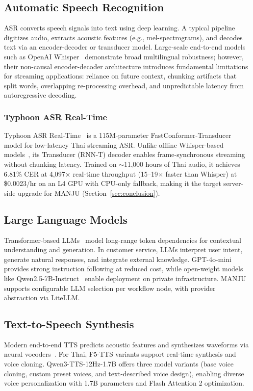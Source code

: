 \documentclass[10pt, a4paper, twocolumn]{article}
\begin{document}
\subsection{Automatic Speech Recognition}
ASR converts speech signals into text using deep learning.
A typical pipeline digitizes audio, extracts acoustic features (e.g., mel-spectrograms), and decodes text via an encoder-decoder or transducer model.
Large-scale end-to-end models such as OpenAI Whisper~\cite{radford2022whisper} demonstrate broad multilingual robustness; however, their non-causal encoder-decoder architecture introduces fundamental limitations for streaming applications: reliance on future context, chunking artifacts that split words, overlapping re-processing overhead, and unpredictable latency from autoregressive decoding.

\subsubsection{Typhoon ASR Real-Time}
Typhoon ASR Real-Time~\cite{sirichotedumrong2026typhoonasr} is a 115M-parameter FastConformer-Transducer model for low-latency Thai streaming ASR.
Unlike offline Whisper-based models~\cite{tipaksorn2024pathumma,aung2024thonburian}, its Transducer (RNN-T) decoder enables frame-synchronous streaming without chunking latency.
Trained on $\sim$11{,}000 hours of Thai audio, it achieves 6.81\% CER at 4{,}097$\times$ real-time throughput (15--19$\times$ faster than Whisper) at \$0.0023/hr on an L4 GPU with CPU-only fallback, making it the target server-side upgrade for MANJU (Section~\ref{sec:conclusion}).

\subsection{Large Language Models}
Transformer-based LLMs~\cite{vaswani2017attention} model long-range token dependencies for contextual understanding and generation.
In customer service, LLMs interpret user intent, generate natural responses, and integrate external knowledge.
GPT-4o-mini~\cite{openai2024gpt4o} provides strong instruction following at reduced cost, while open-weight models like Qwen2.5-7B-Instruct~\cite{qwen2024qwen25} enable deployment on private infrastructure.
MANJU supports configurable LLM selection per workflow node, with provider abstraction via LiteLLM.

\subsection{Text-to-Speech Synthesis}
Modern end-to-end TTS predicts acoustic features and synthesizes waveforms via neural vocoders~\cite{tan2021ttssurvey}.
For Thai, F5-TTS variants support real-time synthesis and voice cloning.
Qwen3-TTS-12Hz-1.7B offers three model variants (base voice cloning, custom preset voices, and text-described voice design), enabling diverse voice personalization with 1.7B parameters and Flash Attention 2 optimization.
\end{document}
